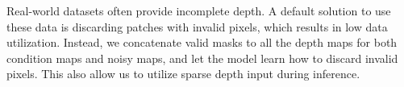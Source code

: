 
Real-world datasets often provide incomplete depth. A default solution to use these data is discarding patches with invalid pixels, which results in low data utilization. Instead, we concatenate valid masks to all the depth maps for both condition maps and noisy maps, and let the model learn how to discard invalid pixels. 
This also allow us to utilize sparse depth input during inference. 


